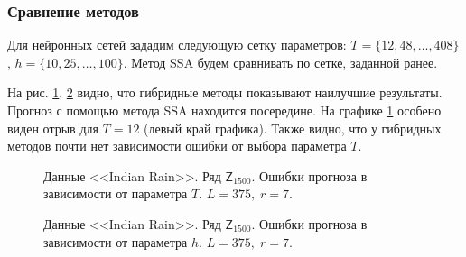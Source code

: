 \documentclass[specialist,
               substylefile = spbu.rtx,
               subf,href,colorlinks=true, 12p]{disser}
\begin{document}
\subsubsection{Сравнение методов}

Для нейронных сетей зададим следующую сетку параметров: $T = \{12, 48, \ldots, 408 \}$, $h = \{10, 25, \ldots, 100 \}$. Метод SSA будем сравнивать по сетке, заданной ранее.

На рис. \ref{first_comp}, \ref{first_comp.h} видно, что гибридные методы показывают наилучшие результаты. Прогноз с помощью метода SSA находится посередине. На графике \ref{first_comp} особено виден отрыв для $T = 12$ (левый край графика). Также видно, что у гибридных методов почти нет зависимости ошибки от выбора параметра $T$.

\begin{figure}[H]
	\captionsetup{justification=centering}
	\caption{Данные <<Indian Rain>>. Ряд $\mathsf{Z}_{1500}$. Ошибки прогноза в зависимости от параметра $T$. $L = 375, \; r = 7$.}
	\label{first_comp}
\end{figure}

\begin{figure}[H]
	\captionsetup{justification=centering}
	\caption{Данные <<Indian Rain>>. Ряд $\mathsf{Z}_{1500}$. Ошибки прогноза в зависимости от параметра $h$. $L = 375, \; r = 7$.}
	\label{first_comp.h}
\end{figure}
\end{document}
